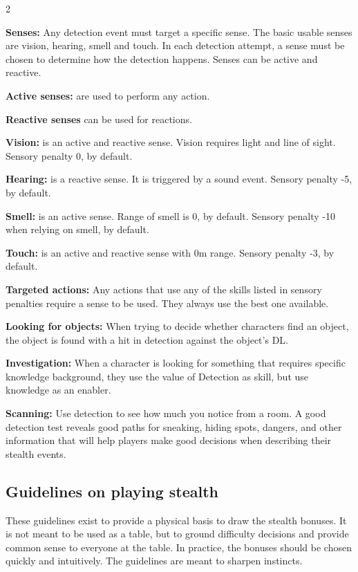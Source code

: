 \begin{multicols}{2}
{\textbf{Senses:} Any detection event must target a specific sense. The basic usable senses are vision, hearing, smell and touch. In each detection attempt, a sense must be chosen to determine how the detection happens. Senses can be active and reactive.

\textbf{Active senses:} are used to perform any action.

\textbf{Reactive senses} can be used for reactions. 

\textbf{Vision:} is an active and reactive sense. Vision requires light and line of sight. Sensory penalty 0, by default.

\textbf{Hearing:} is a reactive sense. It is triggered by a sound event. Sensory penalty -5, by default.

\textbf{Smell:} is an active sense. Range of smell is 0, by default. Sensory penalty -10 when relying on smell, by default. 

\textbf{Touch:} is an active and reactive sense with 0m range. Sensory penalty -3, by default.

\textbf{Targeted actions:} Any actions that use any of the skills listed in sensory penalties require a sense to be used. They always use the best one available.

\textbf{Looking for objects:} When trying to decide whether characters find an object, the object is found with a hit in detection against the object's DL.

\textbf{Investigation:} When a character is looking for something that requires specific knowledge background, they use the value of Detection as skill, but use knowledge as an enabler.

\textbf{Scanning:} Use detection to see how much you notice from a room. A good detection test reveals good paths for sneaking, hiding spots, dangers, and other information that will help players make good decisions when describing their stealth events.
}


\subsection{Guidelines on playing stealth}

These guidelines exist to provide a physical basis to draw the stealth bonuses. It is not meant to be used as a table, but to ground difficulty decisions and provide common sense to everyone at the table. In practice, the bonuses should be chosen quickly and intuitively. The guidelines are meant to sharpen instincts.


\end{multicols}
